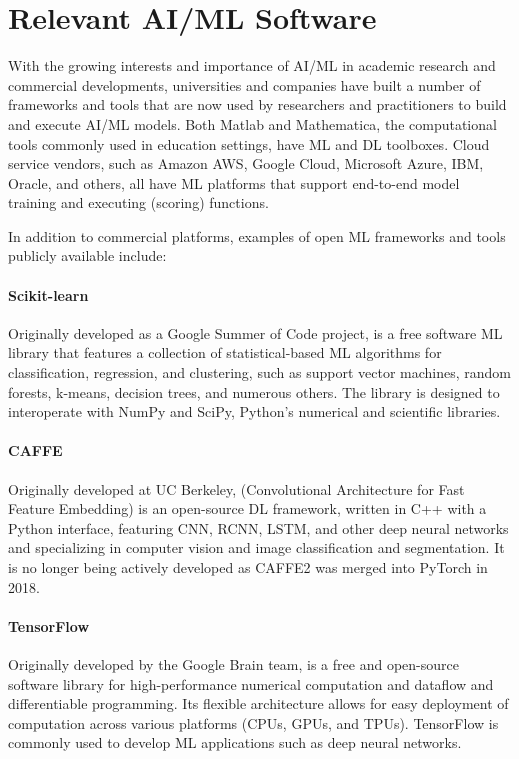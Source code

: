 \section{Relevant AI/ML Software}
\label{sec:ai_tools}

With the growing interests and importance of AI/ML in academic research and commercial developments, universities and companies have built a number of frameworks and tools that are now used by researchers and practitioners to build and execute AI/ML models. Both Matlab and Mathematica, the computational tools commonly used in education settings, have ML and DL toolboxes. Cloud service vendors, such as Amazon AWS, Google Cloud, Microsoft Azure, IBM, Oracle, and others, all have ML platforms that support end-to-end model training and executing (scoring) functions. 

In addition to commercial platforms, examples of open ML frameworks and tools publicly available include:

\paragraph{Scikit-learn}
Originally developed as a Google Summer of Code project,  is a free software ML library that features a collection of statistical-based ML algorithms for classification, regression, and clustering, such as support vector machines, random forests, k-means, decision trees, and numerous others. The library is designed to interoperate with NumPy and SciPy, Python's numerical and scientific libraries. 

\paragraph{CAFFE} 
Originally developed at UC Berkeley,  (Convolutional Architecture for Fast Feature Embedding) is an open-source DL framework, written in C++ with a Python interface, featuring CNN, RCNN, LSTM, and other deep neural networks and specializing in computer vision and image classification and segmentation. It is no longer being actively developed as CAFFE2 was merged into PyTorch in 2018.

\paragraph{TensorFlow} Originally developed by the Google Brain team,  is a free and open-source software library for high-performance numerical computation and dataflow and differentiable programming. Its flexible architecture allows for easy deployment of computation across various platforms (CPUs, GPUs, and TPUs). TensorFlow is commonly used to develop ML applications such as deep neural networks.

